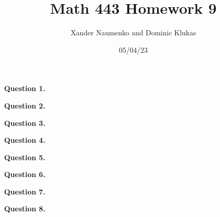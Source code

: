 \documentclass[letterpaper, reqno,11pt]{article}
\begin{document}
\title{Math 443 Homework 9}
\date{05/04/23}
\author{Xander Naumenko and Dominic Klukas}
\maketitle

{\medskip\noindent\bf Question 1.}  

{\medskip\noindent\bf Question 2.}  

{\medskip\noindent\bf Question 3.}  

{\medskip\noindent\bf Question 4.}  

{\medskip\noindent\bf Question 5.}  

{\medskip\noindent\bf Question 6.}  

{\medskip\noindent\bf Question 7.}  

{\medskip\noindent\bf Question 8.}  
\end{document}
